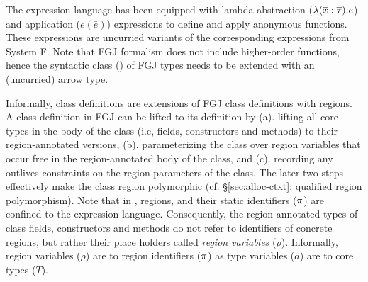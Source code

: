 The expression language has been equipped with lambda abstraction
($\lambdaexp{...}{\xbar : \taubar}{e}$) and application ($e(\bar{e})$)
expressions to define and apply anonymous functions. These expressions
are uncurried variants of the corresponding expressions from System F.
Note that FGJ formalism does not include higher-order functions, hence
the syntactic class () of FGJ types needs to be extended with an
(uncurried) arrow type.

Informally, \FB class definitions are extensions of FGJ class
definitions with regions. A class definition in FGJ can be lifted to
its \FB definition by (a). lifting all core types in the body of the
class (i.e, fields, constructors and methods) to their
region-annotated versions, (b). parameterizing the class over
region variables that occur free in the region-annotated body of the
class, and (c). recording any outlives constraints on the region
parameters of the class. The later two steps effectively make the
class region polymorphic (cf. \S\ref{sec:alloc-ctxt}: qualified region
polymorphism). Note that in \FB, regions, and their static identifiers
($\rgn$) are confined to the expression language. Consequently, the
region annotated types of class fields, constructors and methods do
not refer to identifiers of concrete regions, but rather their place
holders called \emph{region variables} ($\rho$). Informally, region
variables ($\rho$) are to region identifiers ($\rgn$) as type
variables ($a$) are to core types ($T$). 

